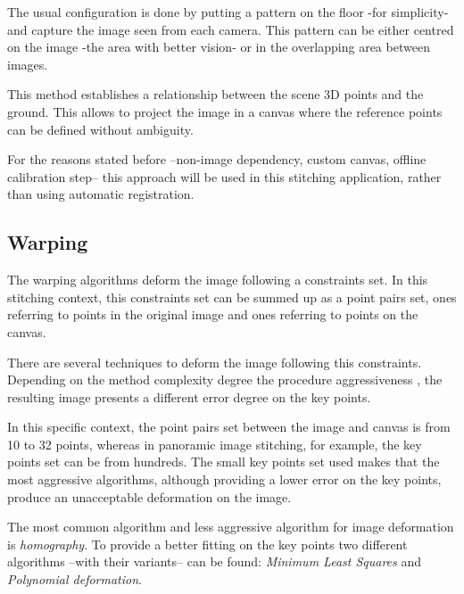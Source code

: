 The usual configuration is done by putting a pattern on the floor -for simplicity- and capture the image seen from each camera. This pattern can be either centred on the image -the area with better vision- or in the overlapping area between images. 

This method establishes a relationship between the scene 3D points and the ground. This allows to project the image in a canvas where the reference points can be defined without ambiguity. 

For the reasons stated before --non-image dependency, custom canvas, offline calibration step--  this approach will be used in this stitching application, rather than using automatic registration.


\subsection{Warping}
The warping algorithms deform the image following a constraints set. In this stitching context, this constraints set can be summed up as a point pairs set, ones referring to points in the original image and ones referring to points on the canvas.

There are several techniques to deform the image following this constraints. Depending on the method complexity degree the procedure aggressiveness , the resulting image presents a different error degree on the key points.

In this specific context, the point pairs set between the image and canvas is from 10 to 32 points, whereas in panoramic image stitching, for example, the key points set can be from hundreds. The small key points set used makes that the most aggressive algorithms, although providing a lower error on the key points, produce an unacceptable deformation on the image.

The most common algorithm and less aggressive algorithm for image deformation is \emph{homography}.  To provide a better fitting on the key points two different algorithms --with their variants-- can be found: \emph{Minimum Least Squares} and \emph{Polynomial deformation}.

